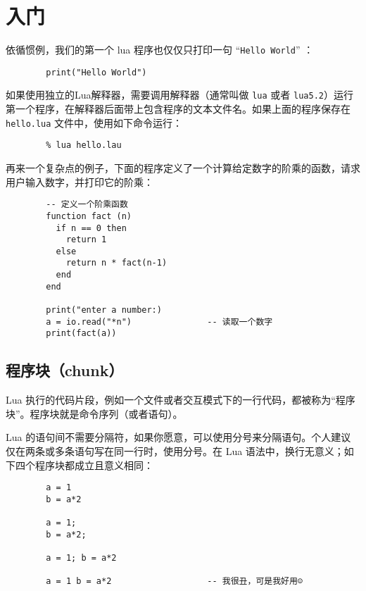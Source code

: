 \chapter{入门}
\setlength{\parindent}{2em}
\small

依循惯例，我们的第一个 lua 程序也仅仅只打印一句 ``\verb|Hello World|'' ：

\begin{verbatim}
        print("Hello World")
\end{verbatim}

如果使用独立的Lua解释器，需要调用解释器（通常叫做 \verb|lua| 或者 \verb|lua5.2|）运行第一个程序，在解释器后面带上包含程序的文本文件名。如果上面的程序保存在 \verb|hello.lua| 文件中，使用如下命令运行：

\begin{verbatim}
        % lua hello.lau
\end{verbatim}

再来一个复杂点的例子，下面的程序定义了一个计算给定数字的阶乘的函数，请求用户输入数字，并打印它的阶乘：

\begin{verbatim}
        -- 定义一个阶乘函数
        function fact (n)
          if n == 0 then
            return 1
          else
            return n * fact(n-1)
          end
        end

        print("enter a number:)
        a = io.read("*n")               -- 读取一个数字
        print(fact(a))
\end{verbatim}

\section{程序块（chunk）}

Lua 执行的代码片段，例如一个文件或者交互模式下的一行代码，都被称为``程序块''。程序块就是命令序列（或者语句）。

Lua 的语句间不需要分隔符，如果你愿意，可以使用分号来分隔语句。个人建议仅在两条或多条语句写在同一行时，使用分号。在 Lua 语法中，换行无意义；如下四个程序块都成立且意义相同：

\begin{verbatim}
        a = 1
        b = a*2

        a = 1;
        b = a*2;

        a = 1; b = a*2

        a = 1 b = a*2                   -- 我很丑，可是我好用☺
\end{verbatim}

